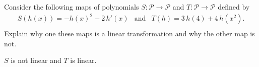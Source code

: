 
\begin{exerciseStatement}


Consider the following maps of polynomials \(S:\mathcal{P}\rightarrow\mathcal{P}\) and \(T:\mathcal{P}\rightarrow\mathcal{P}\) defined by 
\begin{align*} S(h(x))= -h\left(x\right)^{2} - 2 \, h'\left(x\right)  & \text{and} & T(h)= 3 \, h\left(4\right) + 4 \, h\left(x^{2}\right) . \\ \end{align*}
             Explain why one these maps is a linear transformation and why the other map is not. 


\end{exerciseStatement}
    
\begin{exerciseAnswer} 


\(S\) is not linear and \(T\) is linear.


\end{exerciseAnswer}
    
